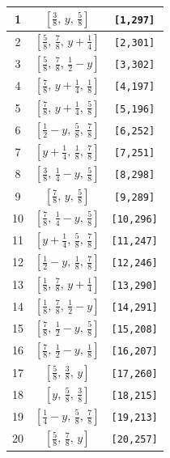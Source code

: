 \documentclass[fleqn,8pt]{jsarticle}
\begin{document}
\begin{longtable}{ccc}
1 & $\left[ \frac{3}{8},\, y,\, \frac{5}{8} \right]$ & {\tt [1,297]} \\ \hline
2 & $\left[ \frac{5}{8},\, \frac{7}{8},\, y + \frac{1}{4} \right]$ & {\tt [2,301]} \\ \hline
3 & $\left[ \frac{5}{8},\, \frac{7}{8},\, \frac{1}{2} - y \right]$ & {\tt [3,302]} \\ \hline
4 & $\left[ \frac{7}{8},\, y + \frac{1}{4},\, \frac{1}{8} \right]$ & {\tt [4,197]} \\ \hline
5 & $\left[ \frac{7}{8},\, y + \frac{1}{4},\, \frac{5}{8} \right]$ & {\tt [5,196]} \\ \hline
6 & $\left[ \frac{1}{2} - y,\, \frac{5}{8},\, \frac{7}{8} \right]$ & {\tt [6,252]} \\ \hline
7 & $\left[ y + \frac{1}{4},\, \frac{1}{8},\, \frac{7}{8} \right]$ & {\tt [7,251]} \\ \hline
8 & $\left[ \frac{3}{8},\, \frac{1}{4} - y,\, \frac{5}{8} \right]$ & {\tt [8,298]} \\ \hline
9 & $\left[ \frac{7}{8},\, y,\, \frac{5}{8} \right]$ & {\tt [9,289]} \\ \hline
10 & $\left[ \frac{7}{8},\, \frac{1}{4} - y,\, \frac{5}{8} \right]$ & {\tt [10,296]} \\ \hline
11 & $\left[ y + \frac{1}{4},\, \frac{5}{8},\, \frac{7}{8} \right]$ & {\tt [11,247]} \\ \hline
12 & $\left[ \frac{1}{2} - y,\, \frac{1}{8},\, \frac{7}{8} \right]$ & {\tt [12,246]} \\ \hline
13 & $\left[ \frac{1}{8},\, \frac{7}{8},\, y + \frac{1}{4} \right]$ & {\tt [13,290]} \\ \hline
14 & $\left[ \frac{1}{8},\, \frac{7}{8},\, \frac{1}{2} - y \right]$ & {\tt [14,291]} \\ \hline
15 & $\left[ \frac{7}{8},\, \frac{1}{2} - y,\, \frac{5}{8} \right]$ & {\tt [15,208]} \\ \hline
16 & $\left[ \frac{7}{8},\, \frac{1}{2} - y,\, \frac{1}{8} \right]$ & {\tt [16,207]} \\ \hline
17 & $\left[ \frac{5}{8},\, \frac{3}{8},\, y \right]$ & {\tt [17,260]} \\ \hline
18 & $\left[ y,\, \frac{5}{8},\, \frac{3}{8} \right]$ & {\tt [18,215]} \\ \hline
19 & $\left[ \frac{1}{4} - y,\, \frac{5}{8},\, \frac{7}{8} \right]$ & {\tt [19,213]} \\ \hline
20 & $\left[ \frac{5}{8},\, \frac{7}{8},\, y \right]$ & {\tt [20,257]} \\ \hline

\end{longtable}
\end{document}
